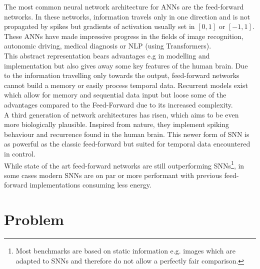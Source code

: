 The most common neural network architecture for \acp{ANN} are the feed-forward networks.
In these networks, information travels only in one direction and is not propagated by spikes but gradients of activation usually set in $[0,1]$ or $[-1,1]$.
These \acp{ANN} have made impressive progress in the fields of image recognition, autonomic driving, medical diagnosis\cite{patel_applications_2007} or  \ac{NLP} (using Transformers\cite{vaswani_attention_2017}).\\
This abstract representation bears advantages e.g in modelling and implementation but also gives away some key features of the human brain. Due to the information travelling only towards the output, feed-forward networks cannot build a memory or easily process temporal data. Recurrent models exist which allow for memory \cite{hutchison_biologically_2004} and sequential data input but loose some of the advantages compared to the Feed-Forward due to its increased complexity.\\
A third generation\cite{maass_networks_1997} of network architectures has risen, which aims to be even more biologically plausible. Inspired from nature, they implement spiking behaviour and recurrence found in the human brain.
This newer form of \ac{SNN} is as powerful as the classic feed-forward but suited for temporal data encountered in control.\\
While state of the art feed-forward networks are still outperforming \acp{SNN}\footnote{Most benchmarks are based on static information e.g. images which are adapted to \acp{SNN} and therefore do not allow a perfectly fair comparison.}, in some cases modern \acp{SNN} are on par\cite{lee_training_2016} or more performant with previous feed-forward implementations consuming less energy.

%

\section{Problem}





